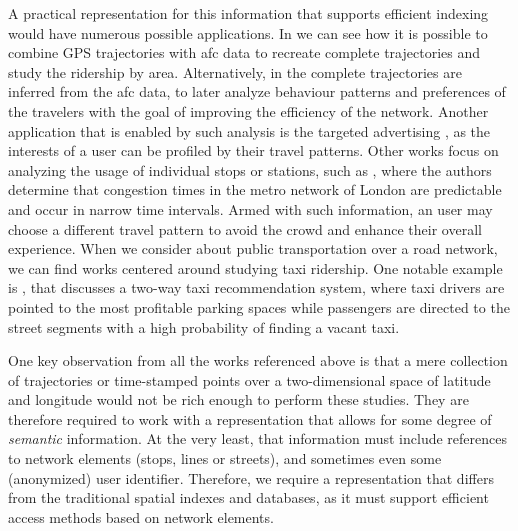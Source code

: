 \documentclass[a4paper,10pt,twoside]{book}
\begin{document}
	
	A practical representation for this information that supports efficient indexing would have numerous possible applications. In \cite{tu2018spatial} we can see how it is possible to combine GPS trajectories with \gls{afc} data to recreate complete trajectories and study the ridership by area. Alternatively, in \cite{weng2018mining} the complete trajectories are inferred from the \gls{afc} data, to later analyze behaviour patterns and preferences of the travelers with the goal of improving the efficiency of the network. Another application that is enabled by such analysis is the targeted advertising \cite{zhang2017targeted}, as the interests of a user can be profiled by their travel patterns. Other works focus on analyzing the usage of individual stops or stations, such as \cite{ceapa2012avoiding}, where the authors determine that congestion times in the metro network of London are predictable and occur in narrow time intervals. Armed with such information, an user may choose a different travel pattern to avoid the crowd and enhance their overall experience. When we consider about public transportation over a road network, we can find works centered around studying taxi ridership. One notable example is \cite{yuan2013t}, that discusses a two-way taxi recommendation system, where taxi drivers are pointed to the most profitable parking spaces while passengers are directed to the street segments with a high probability of finding a vacant taxi.
	
	One key observation from all the works referenced above is that a mere collection of trajectories or time-stamped points over a two-dimensional space of latitude and longitude would not be rich enough to perform these studies. They are therefore required to work with a representation that allows for some degree of \textit{semantic} information. At the very least, that information must include references to network elements (stops, lines or streets), and sometimes even some (anonymized) user identifier. Therefore, we require a representation that differs from the traditional spatial indexes and databases, as it must support efficient access methods based on network elements.
	
\end{document}
